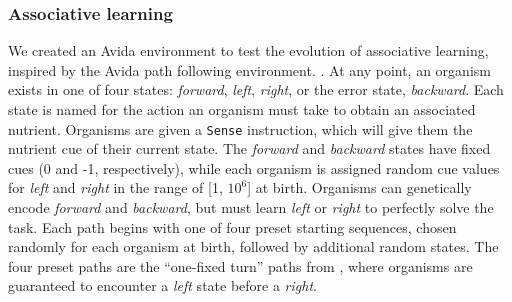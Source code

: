 \subsubsection{Associative learning}
\label{subsub-environment}
We created an Avida environment to test the evolution of associative learning, inspired by the Avida path following environment. %
\citep{pontesEvolutionaryOriginAssociative2020}. %
At any point, an organism exists in one of four states: \textit{forward}, \textit{left}, \textit{right}, or the error state, \textit{backward}.
Each state is named for the action an organism must take to obtain an associated nutrient. %
%
Organisms are given a \texttt{Sense} instruction, which will give them the nutrient cue of their current state. 
The \textit{forward} and \textit{backward} states have fixed cues (0 and -1, respectively), while each organism is assigned random cue values for \textit{left} and \textit{right} in the range of [1, $10^{6}$] at birth. %
Organisms can genetically encode \textit{forward} and \textit{backward}, but must learn \textit{left} or \textit{right} to perfectly solve the task.
Each path begins with one of four preset starting sequences, chosen randomly for each organism at birth, followed by additional random states. %
The four preset paths are the ``one-fixed turn'' paths from \citep{pontesEvolutionaryOriginAssociative2020}, where organisms are guaranteed to encounter a \textit{left} state before a \textit{right}.

